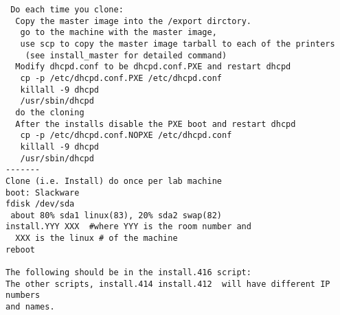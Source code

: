 \begin{verbatim}
 Do each time you clone:
  Copy the master image into the /export dirctory.
   go to the machine with the master image,
   use scp to copy the master image tarball to each of the printers
    (see install_master for detailed command)
  Modify dhcpd.conf to be dhcpd.conf.PXE and restart dhcpd
   cp -p /etc/dhcpd.conf.PXE /etc/dhcpd.conf
   killall -9 dhcpd
   /usr/sbin/dhcpd
  do the cloning
  After the installs disable the PXE boot and restart dhcpd
   cp -p /etc/dhcpd.conf.NOPXE /etc/dhcpd.conf
   killall -9 dhcpd
   /usr/sbin/dhcpd
-------
Clone (i.e. Install) do once per lab machine
boot: Slackware
fdisk /dev/sda
 about 80% sda1 linux(83), 20% sda2 swap(82)
install.YYY XXX  #where YYY is the room number and 
  XXX is the linux # of the machine
reboot

The following should be in the install.416 script:
The other scripts, install.414 install.412  will have different IP numbers
and names.


\end{verbatim}
